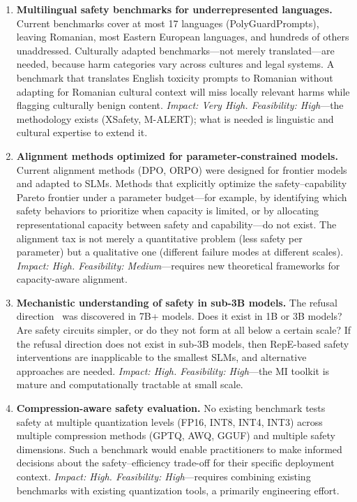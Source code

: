 \documentclass[12pt,a4paper]{article}
\begin{document}
\begin{enumerate}[leftmargin=*]
    \item \textbf{Multilingual safety benchmarks for underrepresented languages.} Current benchmarks cover at most 17 languages (PolyGuardPrompts), leaving Romanian, most Eastern European languages, and hundreds of others unaddressed. Culturally adapted benchmarks---not merely translated---are needed, because harm categories vary across cultures and legal systems. A benchmark that translates English toxicity prompts to Romanian without adapting for Romanian cultural context will miss locally relevant harms while flagging culturally benign content. \emph{Impact: Very High. Feasibility: High}---the methodology exists (XSafety, M-ALERT); what is needed is linguistic and cultural expertise to extend it.

    \item \textbf{Alignment methods optimized for parameter-constrained models.} Current alignment methods (DPO, ORPO) were designed for frontier models and adapted to SLMs. Methods that explicitly optimize the safety--capability Pareto frontier under a parameter budget---for example, by identifying which safety behaviors to prioritize when capacity is limited, or by allocating representational capacity between safety and capability---do not exist. The alignment tax is not merely a quantitative problem (less safety per parameter) but a qualitative one (different failure modes at different scales). \emph{Impact: High. Feasibility: Medium}---requires new theoretical frameworks for capacity-aware alignment.

    \item \textbf{Mechanistic understanding of safety in sub-3B models.} The refusal direction~\citep{arditi2024refusal} was discovered in 7B+ models. Does it exist in 1B or 3B models? Are safety circuits simpler, or do they not form at all below a certain scale? If the refusal direction does not exist in sub-3B models, then RepE-based safety interventions are inapplicable to the smallest SLMs, and alternative approaches are needed. \emph{Impact: High. Feasibility: High}---the MI toolkit is mature and computationally tractable at small scale.

    \item \textbf{Compression-aware safety evaluation.} No existing benchmark tests safety at multiple quantization levels (FP16, INT8, INT4, INT3) across multiple compression methods (GPTQ, AWQ, GGUF) and multiple safety dimensions. Such a benchmark would enable practitioners to make informed decisions about the safety--efficiency trade-off for their specific deployment context. \emph{Impact: High. Feasibility: High}---requires combining existing benchmarks with existing quantization tools, a primarily engineering effort.


\end{enumerate}
\end{document}
